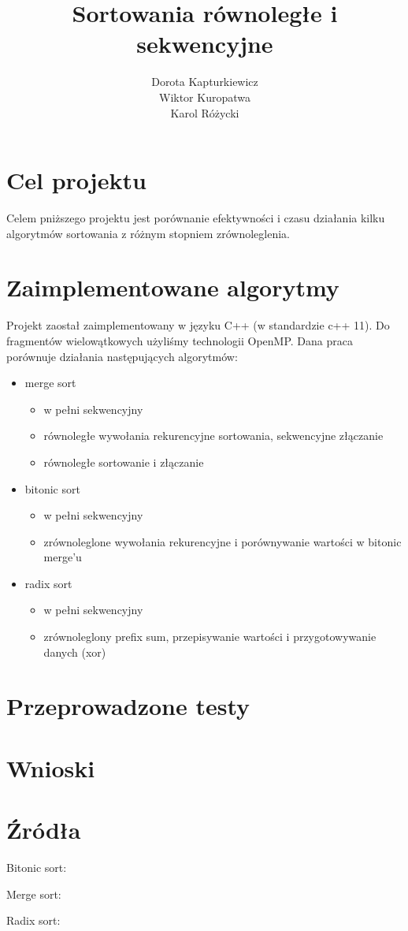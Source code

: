 \documentclass[11pt]{article}
\title{\textbf{Sortowania równoległe i sekwencyjne}}
\author{Dorota Kapturkiewicz\\
		Wiktor Kuropatwa\\
		Karol Różycki}
\date{}
\begin{document}
\maketitle

\section{Cel projektu}
Celem pniższego projektu jest porównanie efektywności i czasu działania kilku algorytmów sortowania z różnym stopniem zrównoleglenia.

\section{Zaimplementowane algorytmy}
Projekt zaostał zaimplementowany w języku C++ (w standardzie c++ 11).
Do fragmentów wielowątkowych użyliśmy technologii OpenMP. \newline
Dana praca porównuje działania następujących algorytmów:
\begin{itemize}

\item merge sort 
\begin{itemize}
\item w pełni sekwencyjny 
\item równoległe wywołania rekurencyjne sortowania, sekwencyjne złączanie
\item równoległe sortowanie i złączanie
\end{itemize}

\item bitonic sort
\begin{itemize}
\item w pełni sekwencyjny 
\item zrównoleglone wywołania rekurencyjne i porównywanie wartości w bitonic merge'u
\end{itemize}

\item radix sort
\begin{itemize}
\item w pełni sekwencyjny 
\item zrównoleglony prefix sum, przepisywanie wartości i przygotowywanie danych (xor)
\end{itemize}

\end{itemize}


\section{Przeprowadzone testy}



\section{Wnioski}

\section{Źródła}
Bitonic sort:


Merge sort:


Radix sort:

\end{document}
